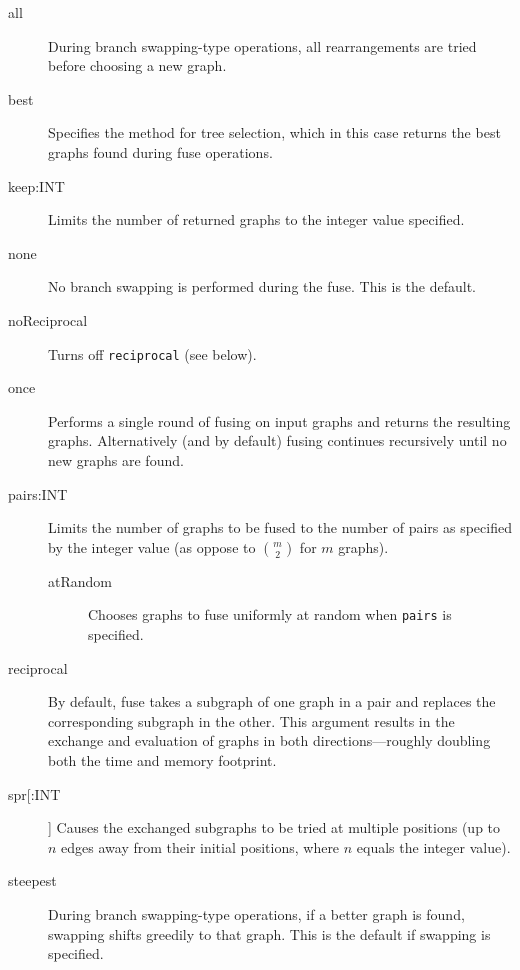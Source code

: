 	\begin{description}
	
		\item [all]  During branch swapping-type operations, all rearrangements are tried before 
		choosing a new graph. 
		
		\item [best] Specifies the method for tree selection, which in this case returns the best 
		graphs found during fuse operations.		
		
		\item [keep:INT] Limits the number of returned graphs to the integer value specified. 
		
		\item [none] No branch swapping is performed during the fuse. This is the default.
		
		\item [noReciprocal] Turns off \texttt{reciprocal} (see below).
		
		\item [once] Performs a single round of fusing on input graphs and returns the resulting 
		graphs. Alternatively (and by default) fusing continues recursively until no new graphs 
		are found.
		
		\item [pairs:INT] Limits the number of graphs to be fused to the number of pairs as 
		specified by the integer value (as oppose to $\binom{m}{2}$ for $m$ graphs).
		
		\begin{description}
			
			\item [atRandom] Chooses graphs to fuse uniformly at random when \texttt{pairs} is 
			specified. 
			
		\end{description}
		
		\item [reciprocal] By default, fuse takes a subgraph of one graph in a pair and replaces the 
		corresponding subgraph in the other.  This argument results in the exchange and evaluation 
		of graphs in both directions---roughly doubling both the time and memory footprint.
		
		\item [spr[:INT]] Causes the exchanged subgraphs to be tried at multiple positions (up to 
		$n$ edges away from their initial positions, where $n$ equals the integer value).
		
		\item [steepest] During branch swapping-type operations, if a better graph is found, swapping 
		shifts greedily to that graph. This is the default if swapping is specified.
		

\end{description}
